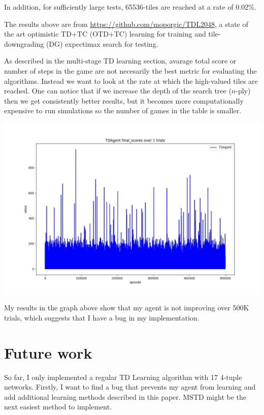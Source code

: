 \documentclass[letterpaper]{article} %
\begin{document}
In addition, for sufficiently large tests, 65536-tiles are reached at a rate of 0.02\%.

The results above are from \href{https://github.com/moporgic/TDL2048}{https://github.com/moporgic/TDL2048}, a state of the art optimistic TD+TC (OTD+TC) learning for training and tile-downgrading (DG) expectimax search for testing. 

As described in the multi-stage TD learning section, avarage total score or number of steps in the game are not necesarily the best metric for evaluating the algorithms. Instead we want to look at the rate at which the high-valued tiles are reached. One can notice that if we increase the depth of the search tree ($n$-ply) then we get consistently better results, but it becomes more computationally expensive to run simulations so the number of games in the table is smaller.

\begin{center}
    \includegraphics[scale=.2]{images/results.jpg}
\end{center}

My results in the graph above show that my agent is not improving over 500K trials, which suggests that I have a bug in my implementation.


\section{Future work}

So far, I only implemented a regular TD Learning algorithm with 17 4-tuple networks. Firstly, I want to find a bug that prevents my agent from learning and add additional learning methods described in this paper. MSTD might be the next easiest method to implement.
\end{document}
